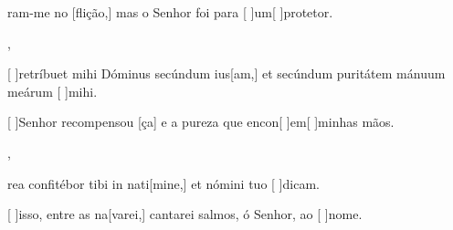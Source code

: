 {        {\item {}ram-me no [flição,] mas o Senhor foi para [ ]{um}[ ]{pro}tetor.},
    {\item {}[ ]{re}tríbuet mihi Dóminus secúndum ius[am,] et secúndum puritátem mánuum meárum [ ]{mi}hi.}%
        {\item {}[ ]{Se}nhor recompensou [ça] e a pureza que encon[ ]{em}[ ]{mi}nhas mãos.},
    {\item {}rea confitébor tibi in nati[mine,] et nómini tuo [ ]{di}cam.}%
        {\item {}[ ]{is}so, entre as na[varei,] cantarei salmos, ó Senhor, ao [ ]{no}me.}
}